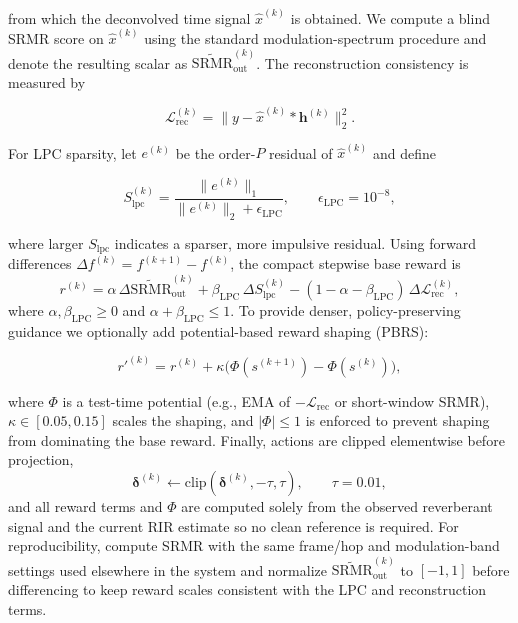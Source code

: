 \documentclass[10pt,conference]{IEEEtran}
\begin{document}
from which the deconvolved time signal \(\hat{x}^{(k)}\) is obtained. We compute a blind SRMR score on \(\hat{x}^{(k)}\) using the standard modulation-spectrum procedure and denote the resulting scalar as \(\widetilde{\mathrm{SRMR}}_{\mathrm{out}}^{(k)}\). The reconstruction consistency is measured by

\[
\mathcal{L}_{\mathrm{rec}}^{(k)}=\|y-\hat{x}^{(k)}*\mathbf{h}^{(k)}\|_2^2.
\]

For LPC sparsity, let \(e^{(k)}\) be the order-\(P\) residual of \(\hat{x}^{(k)}\) and define

\[
S_{\mathrm{lpc}}^{(k)}=\frac{\|e^{(k)}\|_1}{\|e^{(k)}\|_2+\epsilon_{\text{LPC}}},\qquad \epsilon_{\text{LPC}}=10^{-8},
\]

where larger \(S_{\mathrm{lpc}}\) indicates a sparser, more impulsive residual. Using forward differences \(\Delta f^{(k)}=f^{(k+1)}-f^{(k)}\), the compact stepwise base reward is
\begin{equation}
\label{eq:reward_compact_srmr}
r^{(k)}=\alpha\,\Delta\widetilde{\mathrm{SRMR}}_{\mathrm{out}}^{(k)}+\beta_{\text{LPC}}\,\Delta S_{\mathrm{lpc}}^{(k)}-(1-\alpha-\beta_{\text{LPC}})\,\Delta\mathcal{L}_{\mathrm{rec}}^{(k)},
\end{equation}
where \(\alpha,\beta_{\text{LPC}}\ge0\) and \(\alpha+\beta_{\text{LPC}}\le1\). To provide denser, policy-preserving guidance we optionally add potential-based reward shaping (PBRS):

\[
r'^{(k)}=r^{(k)}+\kappa\big(\Phi(s^{(k+1)})-\Phi(s^{(k)})\big),
\]

where \(\Phi\) is a test-time potential (e.g., EMA of \(-\mathcal{L}_{\mathrm{rec}}\) or short-window SRMR), \(\kappa\in[0.05,0.15]\) scales the shaping, and \(|\Phi|\le1\) is enforced to prevent shaping from dominating the base reward. Finally, actions are clipped elementwise before projection,
\begin{equation}
\label{eq:clip_compact_srmr}
\boldsymbol{\delta}^{(k)}\leftarrow\mathrm{clip}(\boldsymbol{\delta}^{(k)},-\tau,\tau),\qquad \tau=0.01,
\end{equation}
and all reward terms and \(\Phi\) are computed solely from the observed reverberant signal and the current RIR estimate so no clean reference is required. For reproducibility, compute SRMR with the same frame/hop and modulation-band settings used elsewhere in the system and normalize \(\widetilde{\mathrm{SRMR}}_{\mathrm{out}}^{(k)}\) to \([-1,1]\) before differencing to keep reward scales consistent with the LPC and reconstruction terms.
\end{document}
